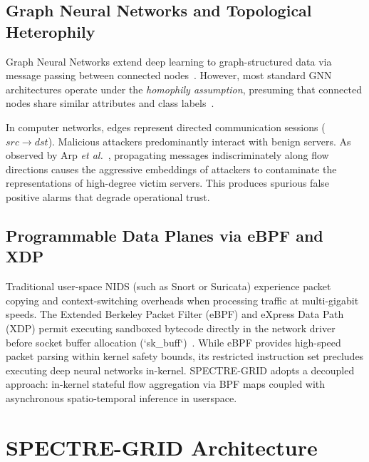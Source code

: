 \documentclass[conference]{IEEEtran}
\begin{document}
\subsection{Graph Neural Networks and Topological Heterophily}
Graph Neural Networks extend deep learning to graph-structured data via message passing between connected nodes~\cite{kipf2017semi,hamilton2017inductive,velickovic2018graph}. However, most standard GNN architectures operate under the \textit{homophily assumption}, presuming that connected nodes share similar attributes and class labels~\cite{zhu2020beyond}.

In computer networks, edges represent directed communication sessions ($src \to dst$). Malicious attackers predominantly interact with benign servers. As observed by Arp \textit{et al.}~\cite{arp2022dos}, propagating messages indiscriminately along flow directions causes the aggressive embeddings of attackers to contaminate the representations of high-degree victim servers. This produces spurious false positive alarms that degrade operational trust.

\subsection{Programmable Data Planes via eBPF and XDP}
Traditional user-space NIDS (such as Snort or Suricata) experience packet copying and context-switching overheads when processing traffic at multi-gigabit speeds. The Extended Berkeley Packet Filter (eBPF) and eXpress Data Path (XDP) permit executing sandboxed bytecode directly in the network driver before socket buffer allocation (`sk\_buff`)~\cite{vieira2020fast,bifulco2018survey,hoever2022kernel}. While eBPF provides high-speed packet parsing within kernel safety bounds, its restricted instruction set precludes executing deep neural networks in-kernel. SPECTRE-GRID adopts a decoupled approach: in-kernel stateful flow aggregation via BPF maps coupled with asynchronous spatio-temporal inference in userspace.

\section{SPECTRE-GRID Architecture}
\end{document}
